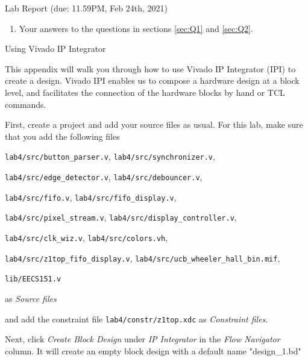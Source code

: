 \documentclass[11pt]{article}
\makeatletter
\renewcommand{\section}
{\@startsection {section}{1}{0pt}
 {-2ex}
 {1ex}
 {\bfseries\Large}}
\renewcommand{\subsection}
{\@startsection {subsection}{1}{0pt}
 {-1ex}
 {0.5ex}
 {\bfseries\normalsize}}
\makeatother
\begin{document}
\subsection{Lab Report (due: 11.59PM, Feb 24th, 2021)}\label{sec:labreport}
\begin{enumerate}
  \item Your answers to the questions in sections \ref{sec:Q1} and \ref{sec:Q2}.
\end{enumerate}

\appendix
\section{Using Vivado IP Integrator}
\label{section:ipi}

This appendix will walk you through how to use Vivado IP Integrator (IPI) to create
a design. Vivado IPI enables us to compose a hardware design at a block level, and
facilitates the connection of the hardware blocks by hand or TCL commands. 

First, create a project and add your source files as usual. For this lab, make sure that you add the following files

\verb|lab4/src/button_parser.v|, \verb|lab4/src/synchronizer.v|,

\verb|lab4/src/edge_detector.v|, \verb|lab4/src/debouncer.v|,

\verb|lab4/src/fifo.v|, \verb|lab4/src/fifo_display.v|,

\verb|lab4/src/pixel_stream.v|, \verb|lab4/src/display_controller.v|,

\verb|lab4/src/clk_wiz.v|, \verb|lab4/src/colors.vh|,

\verb|lab4/src/z1top_fifo_display.v|, \verb|lab4/src/ucb_wheeler_hall_bin.mif|,

\verb|lib/EECS151.v|

as \textit{Source files}

and add the constraint file \verb|lab4/constr/z1top.xdc| as \textit{Constraint files}.

Next, click \emph{Create Block Design} under \emph{IP Integrator} in the \emph{Flow Navigator} column.
It will create an empty block design with a default name "design\_1.bd"

\begin{center}
\end{center}
\end{document}

